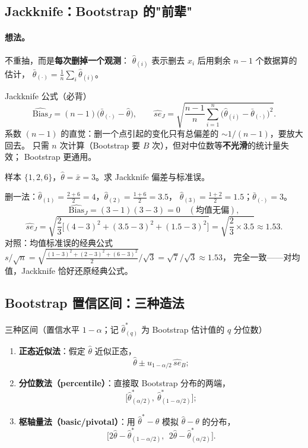 \subsection{Jackknife：Bootstrap 的"前辈"}

\paragraph{想法。}不重抽，而是\textbf{每次删掉一个观测}：
$\hat\theta_{(i)}$ 表示删去 $x_i$ 后用剩余 $n-1$ 个数据算的估计，
$\bar\theta_{(\cdot)}=\frac1n\sum_i\hat\theta_{(i)}$。

\begin{kbox}{Jackknife 公式（必背）}
\[
\widehat{\mathrm{Bias}}_J=(n-1)\big(\bar\theta_{(\cdot)}-\hat\theta\big),\qquad
\widehat{se}_J=\sqrt{\frac{n-1}{n}\sum_{i=1}^n\big(\hat\theta_{(i)}-\bar\theta_{(\cdot)}\big)^2}.
\]
系数 $(n-1)$ 的直觉：删一个点引起的变化只有总偏差的 $\sim1/(n-1)$，要放大回去。
只需 $n$ 次计算（Bootstrap 要 $B$ 次），但对中位数等\textbf{不光滑}的统计量失效；
Bootstrap 更通用。
\end{kbox}

\begin{exbox}[Jackknife 手算]
样本 $\{1,2,6\}$，$\hat\theta=\bar x=3$。求 Jackknife 偏差与标准误。
\end{exbox}
\begin{sol}
删一法：$\hat\theta_{(1)}=\frac{2+6}{2}=4$，$\hat\theta_{(2)}=\frac{1+6}{2}=3.5$，
$\hat\theta_{(3)}=\frac{1+2}{2}=1.5$；$\bar\theta_{(\cdot)}=3$。
\[
\widehat{\mathrm{Bias}}_J=(3-1)(3-3)=0\quad(\text{均值无偏}),
\]
\[
\widehat{se}_J=\sqrt{\frac{2}{3}\big[(4-3)^2+(3.5-3)^2+(1.5-3)^2\big]}
=\sqrt{\frac{2}{3}\times3.5}\approx1.53 .
\]
对照：均值标准误的经典公式 $s/\sqrt n=\sqrt{\frac{(1{-}3)^2+(2{-}3)^2+(6{-}3)^2}{2}}/\sqrt3=\sqrt7/\sqrt3\approx1.53$，
完全一致——对均值，Jackknife 恰好还原经典公式。
\end{sol}

\subsection{Bootstrap 置信区间：三种造法}

\begin{kbox}{三种区间（置信水平 $1-\alpha$；记 $\hat\theta^*_{(q)}$ 为 Bootstrap 估计值的 $q$ 分位数）}
\begin{enumerate}[leftmargin=2em]
  \item \textbf{正态近似法}：假定 $\hat\theta$ 近似正态，
  \[
  \hat\theta\pm u_{1-\alpha/2}\,\widehat{se}_B ;
  \]
  \item \textbf{分位数法（percentile）}：直接取 Bootstrap 分布的两端，
  \[
  \big[\hat\theta^*_{(\alpha/2)},\ \hat\theta^*_{(1-\alpha/2)}\big];
  \]
  \item \textbf{枢轴量法（basic/pivotal）}：用 $\hat\theta^*-\hat\theta$ 模拟 $\hat\theta-\theta$ 的分布，
  \[
  \big[2\hat\theta-\hat\theta^*_{(1-\alpha/2)},\ \ 2\hat\theta-\hat\theta^*_{(\alpha/2)}\big].
  \]
\end{enumerate}
\end{kbox}

